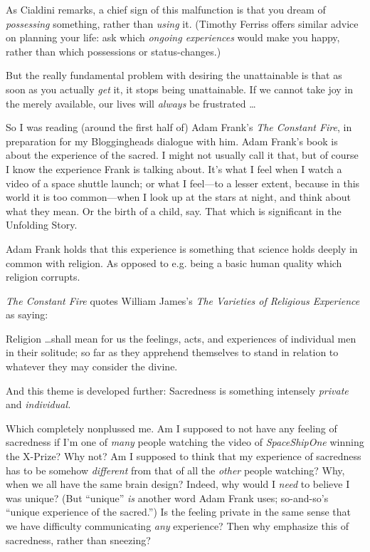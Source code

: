 {
 As Cialdini remarks, a chief sign of this malfunction is that you
dream of \textit{possessing} something, rather than \textit{using} it.
(Timothy Ferriss offers similar advice on planning your life: ask which
\textit{ongoing experiences} would make you happy, rather than which
possessions or status-changes.)}

{
 But the really fundamental problem with desiring the unattainable
is that as soon as you actually \textit{get} it, it stops being
unattainable. If we cannot take joy in the merely available, our lives
will \textit{always} be frustrated \ldots}

\myendsectiontext


\bigskip


{
 So I was reading (around the first half of) Adam
Frank's \textit{The Constant Fire},
in preparation for my Bloggingheads dialogue with him. Adam
Frank's book is about the experience of the sacred. I
might not usually call it that, but of course I know the experience
Frank is talking about. It's what I feel when I watch a
video of a space shuttle launch; or what I feel---to a lesser extent,
because in this world it is too common---when I look up at the stars at
night, and think about what they mean. Or the birth of a child, say.
That which is significant in the Unfolding Story. }

{
 Adam Frank holds that this experience is something that science
holds deeply in common with religion. As opposed to e.g. being a basic
human quality which religion corrupts.}

{
 \textit{The Constant Fire} quotes William James's
\textit{The Varieties of Religious Experience} as saying:}

{
 Religion \ldots shall mean for us the feelings, acts, and
experiences of individual men in their solitude; so far as they
apprehend themselves to stand in relation to whatever they may consider
the divine.}

{
 And this theme is developed further: Sacredness is something
intensely \textit{private} and \textit{individual.}}

{
 Which completely nonplussed me. Am I supposed to not have any
feeling of sacredness if I'm one of \textit{many}
people watching the video of \textit{SpaceShipOne} winning the X-Prize?
Why not? Am I supposed to think that my experience of sacredness has to
be somehow \textit{different} from that of all the \textit{other}
people watching? Why, when we all have the same brain design? Indeed,
why would I \textit{need} to believe I was unique? (But
``unique'' \textit{is} another word
Adam Frank uses; so-and-so's ``unique
experience of the sacred.'') Is the feeling private
in the same sense that we have difficulty communicating \textit{any}
experience? Then why emphasize this of sacredness, rather than
sneezing?}

